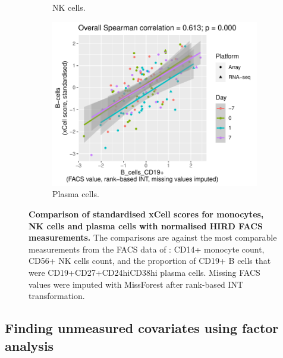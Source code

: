 \begin{figure}
\begin{subfigure}[b]{0.43\textwidth}
        \caption{\gls{NK} cells.}
    \end{subfigure}
    \bigskip\vfill
    \begin{subfigure}[b]{0.43\textwidth}
        \centering
        \includegraphics[width=1.0\textwidth,page=2]{mainmatter/figures/chapter_03/validate_xCell_estimates.cell_type_pairs.pdf}
        \caption{Plasma cells.}
    \end{subfigure}
    \caption{
        \textbf{Comparison of standardised xCell scores for monocytes, \gls{NK} cells and plasma cells with normalised \gls{HIRD} \gls{FACS} measurements.}
        The comparisons are against the most comparable measurements from the \gls{FACS} data of \textcite{sobolev2016AdjuvantedInfluenzaH1N1Vaccination}: 
        CD14+ monocyte count,
        CD56+ NK cells count,
        and the proportion of CD19+ B cells that were CD19+CD27+CD24hiCD38hi plasma cells.
        Missing \gls{FACS} values were imputed with MissForest after rank-based \gls{INT} transformation.
    }
    \label{fig:hird_xCell_vs_FACS}
\end{figure}

\subsection{Finding unmeasured covariates using factor analysis}

%

